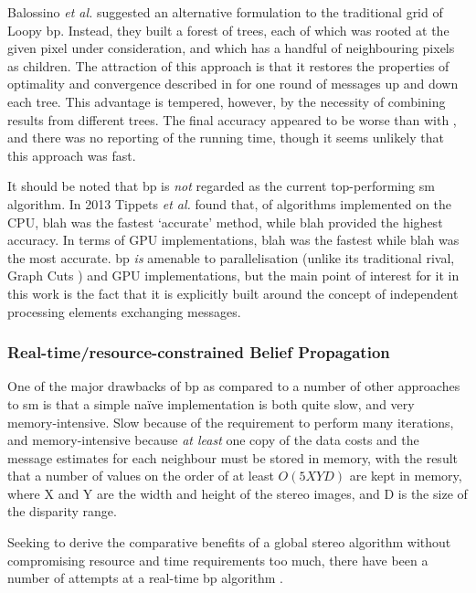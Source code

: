 Balossino \textit{et al.} \cite{Balossino2007} suggested an alternative formulation to the traditional grid of Loopy \gls{bp}.  Instead, they built a forest of trees, each of which was rooted at the given pixel under consideration, and which has a handful of neighbouring pixels as children.  The attraction of this approach is that it restores the properties of optimality and convergence described in \cite{Pearl1982} for one round of messages up and down each tree.  This advantage is tempered, however, by the necessity of combining results from different trees.  The final accuracy appeared to be worse than with \cite{Felzenszwalb2006}, and there was no reporting of the running time, though it seems unlikely that this approach was fast.

It should be noted that \gls{bp} is \emph{not} regarded as the current top-performing \gls{sm} algorithm.  In 2013 Tippets \textit{et al.} found that, of algorithms implemented on the CPU, blah was the fastest `accurate' method, while blah provided the highest accuracy.  In terms of GPU implementations, blah was the fastest while blah was the most accurate.  \gls{bp} \emph{is} amenable to parallelisation (unlike its traditional rival, Graph Cuts \cite{Tappen2003}) and GPU implementations, but the main point of interest for it in this work is the fact that it is explicitly built around the concept of independent processing elements exchanging messages.

\subsubsection{Real-time/resource-constrained Belief Propagation}
One of the major drawbacks of \gls{bp} as compared to a number of other approaches to \gls{sm} is that a simple naïve implementation is both quite slow, and very memory-intensive.  Slow because of the requirement to perform many iterations, and memory-intensive because \emph{at least} one copy of the data costs and the message estimates for each neighbour must be stored in memory, with the result that a number of values on the order of at least \(O(5XYD)\) are kept in memory, where X and Y are the width and height of the stereo images, and D is the size of the disparity range.

Seeking to derive the comparative benefits of a global stereo algorithm without compromising resource and time requirements too much, there have been a number of attempts at a real-time \gls{bp} algorithm \cite{Xiang2012,Yang2010,Yang2006,Liang2011,Gupta2012,Perez2010,Felzenszwalb2006}.

